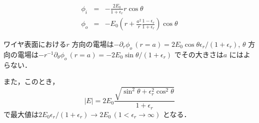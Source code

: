 \documentclass{jsarticle}
\begin{document}
\begin{eqnarray}
\phi_i &=& - \frac{2 E_0}{1+\epsilon_r} r \cos\theta \\ 
\phi_o &=& -E_0\left(r + \frac{a^2}{r}\frac{1-\epsilon_r}{1+\epsilon_r}\right) \cos\theta
\end{eqnarray}

ワイヤ表面における$r$ 方向の電場は$-\partial_r\phi_o\,(r = a) = 2E_0\cos\theta\epsilon_r/(1+\epsilon_r)$, $\theta$ 方向の電場は$-r^{-1}\partial_\theta\phi_o\,(r = a) = -2E_0\sin\theta/(1+\epsilon_r)$ でその大きさは$a$ にはよらない．

また，このとき，
\begin{equation}
|E| = 2E_0\frac{\sqrt{\sin^2\theta + \epsilon_r^2\cos^2\theta}}{1 + \epsilon_r}
\end{equation}
で最大値は$2E_0\epsilon_r/(1+\epsilon_r)\to2E_0\,(1<\epsilon_r\to\infty)$ となる．
\end{document}
